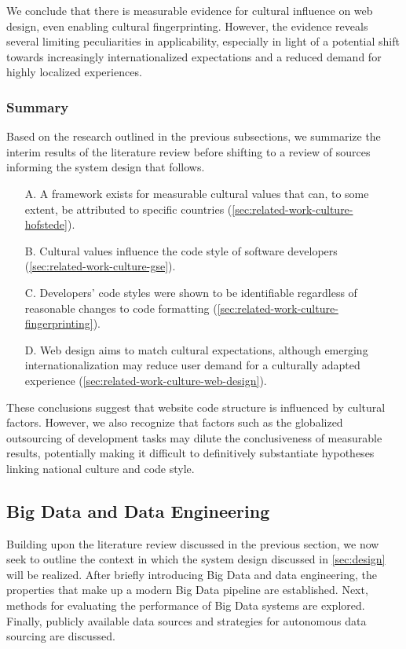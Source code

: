 We conclude that there is measurable evidence for cultural influence on web design, even enabling cultural fingerprinting.
However, the evidence reveals several limiting peculiarities in applicability, especially in light of a potential shift towards increasingly internationalized expectations and a reduced demand for highly localized experiences.


\subsubsection{Summary}
\label{sec:related-work-summary}

Based on the research outlined in the previous subsections, we summarize the interim results of the literature review before shifting to a review of sources informing the system design that follows.

\begin{enumerate}
    \item[A.] A framework exists for measurable cultural values that can, to some extent, be attributed to specific countries (\cref{sec:related-work-culture-hofstede}).
    \item[B.] Cultural values influence the code style of software developers (\cref{sec:related-work-culture-gse}).
    \item[C.] Developers' code styles were shown to be identifiable regardless of reasonable changes to code formatting (\cref{sec:related-work-culture-fingerprinting}).
    \item[D.] Web design aims to match cultural expectations, although emerging internationalization may reduce user demand for a culturally adapted experience (\cref{sec:related-work-culture-web-design}).
\end{enumerate}

These conclusions suggest that website code structure is influenced by cultural factors.
However, we also recognize that factors such as the globalized outsourcing of development tasks may dilute the conclusiveness of measurable results, potentially making it difficult to definitively substantiate hypotheses linking national culture and code style.


\subsection{Big Data and Data Engineering}
\label{sec:related-work-big-data}

Building upon the literature review discussed in the previous section, we now seek to outline the context in which the system design discussed in \cref{sec:design} will be realized.
After briefly introducing Big Data and data engineering, the properties that make up a modern Big Data pipeline are established.
Next, methods for evaluating the performance of Big Data systems are explored.
Finally, publicly available data sources and strategies for autonomous data sourcing are discussed.

